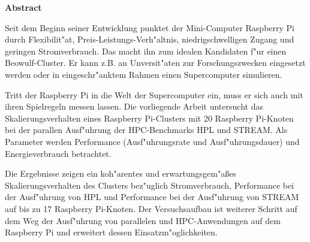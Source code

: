 \vspace*{2cm}

\begin{center}
    \textbf{Abstract}
\end{center}

\vspace*{1cm}

\noindent 
Seit dem Beginn seiner Entwicklung punktet der Mini-Computer Raspberry Pi durch Flexibilit"at, Preis-Leistungs-Verh"altnis, niedrigschwelligen Zugang und geringen Stromverbrauch. Das macht ihn zum idealen Kandidaten f"ur einen Beowulf-Cluster. Er kann z.B. an Unversit"aten zur Forschungszwecken eingesetzt werden oder in eingeschr"anktem Rahmen einen Supercomputer simulieren. 

Tritt der Raspberry Pi in die Welt der Supercomputer ein, muss er sich auch mit ihren Spielregeln messen lassen. Die vorliegende Arbeit untersucht das Skalierungsverhalten eines Raspberry Pi-Clusters mit 20 Raspberry Pi-Knoten bei der parallen Ausf"uhrung der HPC-Benchmarks HPL und STREAM. Als Parameter werden Performance (Ausf"uhrungsrate und Ausf"uhrungsdauer) und Energieverbrauch betrachtet. 

Die Ergebnisse zeigen ein koh"arentes und erwartungsgem"a\ss es Skalierungsverhalten des Clusters bez"uglich Stromverbrauch, Performance bei der Ausf"uhrung von HPL und Performance bei der Ausf"uhrung von STREAM auf bis zu 17 Raspberry Pi-Knoten. Der Versuchsaufbau ist weiterer Schritt auf dem Weg der Ausf"uhrung von parallelen und HPC-Anwendungen auf dem Raspberry Pi und erweitert dessen Einsatzm"oglichkeiten. 